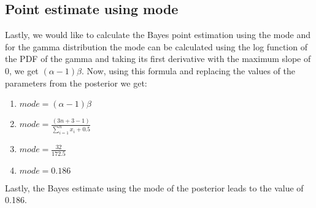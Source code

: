 \subsection{Point estimate using mode}
Lastly, we would like to calculate the Bayes point estimation using the mode and for the gamma distribution the mode can be calculated using the log function of the PDF of the gamma and taking its first derivative with the maximum slope of 0, we get $(\alpha -1)\beta$. Now, using this formula and replacing the values of the parameters from the posterior we get:
\begin{enumerate}
    \item $mode = (\alpha -1)\beta$
    \item $mode = \frac{(3n+3 -1)}{\sum_{i=1}^{n}x_i +0.5}$
    \item $mode = \frac{32}{172.5}$
    \item $mode = 0.186$
\end{enumerate}
Lastly, the Bayes estimate using the mode of the posterior leads to the value of 0.186.